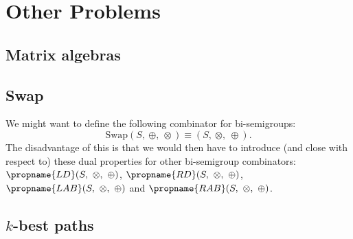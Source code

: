 

\chapter{Other Problems} 

\section{Matrix algebras}

\section{Swap}

We might want to define the following combinator for bi-semigroups:
\[ 
\mathrm{Swap}(S,\ \oplus,\ \otimes)   
   \equiv 
   (S,\ \otimes,\ \oplus). 
\] 
The disadvantage of this is that we would then have to introduce 
(and close with respect to) these dual properties for other bi-semigroup combinators: $\propname{LD}(S,\ \otimes,\ \oplus)$, $\propname{RD}(S,\ \otimes,\ \oplus)$, $\propname{LAB}(S,\ \otimes,\ \oplus)$ and $\propname{RAB}(S,\ \otimes,\ \oplus)$.

\section{$k$-best paths}






